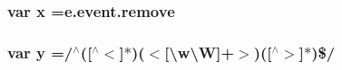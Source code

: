 \subsubsection[{x}]{\setlength{\rightskip}{0pt plus 5cm}var x ={\bf e.\+event.\+remove}}\label{jquery-migrate-1_82_81_8min_8js_a81e910173af87b1161e719a504d52407}
\hypertarget{jquery-migrate-1_82_81_8min_8js_a0b31909b1cae9ed1db6ff042057fce60}{}
\subsubsection[{y}]{\setlength{\rightskip}{0pt plus 5cm}var y =/$^\wedge$(\mbox{[}$^\wedge$$<$\mbox{]}$\ast$)($<$\mbox{[}\textbackslash{}w\textbackslash{}\+W\mbox{]}+$>$)(\mbox{[}$^\wedge$$>$\mbox{]}$\ast$)\$/}\label{jquery-migrate-1_82_81_8min_8js_a0b31909b1cae9ed1db6ff042057fce60}
